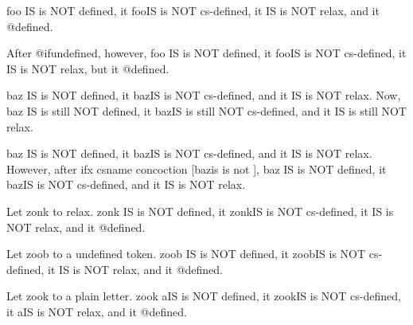 \documentclass{article}
\begin{document}
\makeatletter

foo \ifdefined\foo IS \else is NOT \fi defined,
it \ifcsname foo\endcsname IS \else is NOT \fi cs-defined,
it \ifx\foo\relax IS \else is NOT \fi relax,
and it  @defined.

After @ifundefined, however,
foo \ifdefined\foo IS \else is NOT \fi defined,
it \ifcsname foo\endcsname IS \else is NOT \fi cs-defined,
it \ifx\foo\relax IS \else is NOT \fi relax,
but it  @defined.

baz \ifdefined\baz IS \else is NOT \fi defined,
it \ifcsname baz\endcsname IS \else is NOT \fi cs-defined,
and it \ifx\baz\relax IS \else is NOT \fi relax.
Now,
baz \ifdefined\baz IS \else is still NOT \fi defined,
it \ifcsname baz\endcsname IS \else is still NOT \fi cs-defined,
and it \ifx\baz\relax IS \else is still NOT \fi relax.


baz \ifdefined\baz IS \else is NOT \fi defined,
it \ifcsname baz\endcsname IS \else is NOT \fi cs-defined,
and it \ifx\baz\relax IS \else is NOT \fi relax.
However, after ifx csname concoction
[\expandafter\ifx\csname baz\endcsname\relax is \else is not \fi],
baz \ifdefined\baz IS \else is NOT \fi defined,
it \ifcsname baz\endcsname IS \else is NOT \fi cs-defined,
and it \ifx\baz\relax IS \else is NOT \fi relax.


Let zonk to relax.
\let\zonk\relax
zonk \ifdefined\zonk IS \else is NOT \fi defined,
it \ifcsname zonk\endcsname IS \else is NOT \fi cs-defined,
it \ifx\zonk\relax IS \else is NOT \fi relax,
and it  @defined.

Let zoob to a undefined token.
\let\zoob\zelda
zoob \ifdefined\zoob IS \else is NOT \fi defined,
it \ifcsname zoob\endcsname IS \else is NOT \fi cs-defined,
it \ifx\zoob\relax IS \else is NOT \fi relax,
and it  @defined.

Let zook to a plain letter.
\let\zook=a
zook \ifdefined\zook IS \else is NOT \fi defined,
it \ifcsname zook\endcsname IS \else is NOT \fi cs-defined,
it \ifx\zook\relax IS \else is NOT \fi relax,
and it  @defined.
\end{document}
